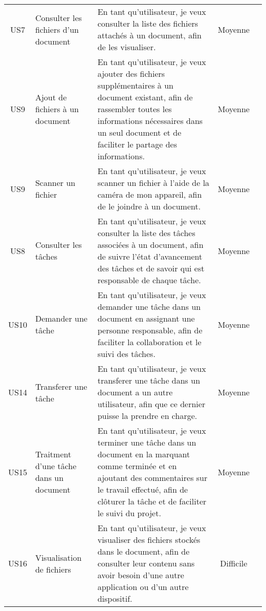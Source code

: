 \begin{landscape}
\begin{adjustwidth}{-1cm}{}
\begin{longtable}{|c|p{5cm}|p{12cm}|c|c|}
    \cline{1-4}
    
    US7&Consulter les fichiers d'un document&En tant qu'utilisateur, je veux consulter la liste des fichiers attachés à un document, afin de les visualiser. &Moyenne&\\
    
    
    
    \cline{1-4}
    US9&Ajout de fichiers à un document&En tant qu'utilisateur, je veux ajouter des fichiers supplémentaires à un document existant, afin de rassembler toutes les informations nécessaires dans un seul document et de faciliter le partage des informations.&Moyenne&\\
    \cline{1-4}
    US9&Scanner un fichier&En tant qu'utilisateur, je veux scanner un fichier à l'aide de la caméra de mon appareil, afin de le joindre à un document.&Moyenne&\\
    \cline{1-4}

    US8&Consulter les tâches&En tant qu'utilisateur, je veux consulter la liste des tâches associées à un document, afin de suivre l'état d'avancement des tâches et de savoir qui est responsable de chaque tâche. &Moyenne&\\
    \cline{1-4}
    US10&Demander une tâche&En tant qu’utilisateur, je veux demander une tâche dans un document en assignant une personne responsable, afin de faciliter la collaboration et le suivi des tâches.&Moyenne&\\
    
    \cline{1-4}
    US14&Transferer une tâche&En tant qu'utilisateur, je veux transferer une tâche dans un document a un autre utilisateur, afin que ce dernier puisse la prendre en charge.&Moyenne&\\
    \cline{1-4}
    US15&Traitment d'une tâche dans un document&En tant qu'utilisateur, je veux terminer une tâche dans un document en la marquant comme terminée et en ajoutant des commentaires sur le travail effectué, afin de clôturer la tâche et de faciliter le suivi du projet. &Moyenne&\\



    \cline{1-4}

    US16&Visualisation de fichiers&En tant qu'utilisateur, je veux visualiser des fichiers stockés dans le document, afin de consulter leur contenu sans avoir besoin d'une autre application ou d'un autre dispositif.&Difficile&\\


\end{longtable}
\end{adjustwidth}
\end{landscape}
